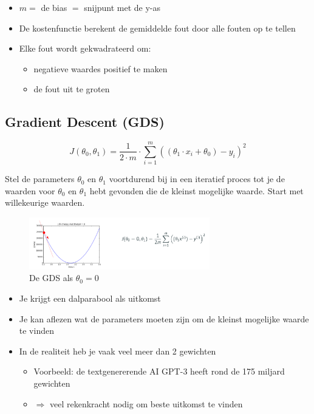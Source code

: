 \documentclass{article}
\begin{document}
\begin{itemize}
    \item $m =$ de bias $=$ snijpunt met de y-as
    \item De kostenfunctie berekent de gemiddelde fout door alle fouten op te tellen
    \item Elke fout wordt gekwadrateerd om:
    \begin{itemize}
        \item negatieve waardes positief te maken
        \item de fout uit te groten
    \end{itemize}
\end{itemize}

\subsection{Gradient Descent (GDS)}

\begin{equation}
J(\theta_0, \theta_1) = \frac{1}{2\cdot m} \cdot \sum_{i=1}^m ((\theta_1\cdot x_i + \theta_0) - y_i)^2
\end{equation}

Stel de parameters $\theta_0$ en $\theta_1$ voortdurend bij in een iteratief proces 
tot je de waarden voor $\theta_0$ en $\theta_1$ hebt gevonden die de kleinst mogelijke waarde. Start met willekeurige waarden.

\begin{figure}[H]
    \centering
    \includegraphics[width=0.7\textwidth]{gradient-descent-theta0.png}
    \caption{De GDS als $\theta_0 = 0$}
\end{figure}

\begin{itemize}
    \item Je krijgt een dalparabool als uitkomst 
    \item Je kan aflezen wat de parameters moeten zijn om de kleinst mogelijke waarde te vinden
    \item In de realiteit heb je vaak veel meer dan 2 gewichten
    \begin{itemize}
        \item Voorbeeld: de textgenererende AI GPT-3 heeft rond de 175 miljard gewichten 
        \item $\Rightarrow$ veel rekenkracht nodig om beste uitkomst te vinden
    \end{itemize}
\end{itemize}
\end{document}

